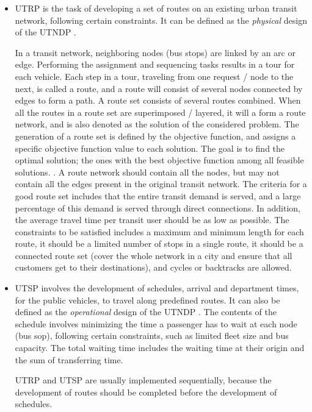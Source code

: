 \begin{itemize}
\item UTRP is the task of developing a set of routes on an existing urban transit network, following certain constraints. It can be defined as the \textit{physical} design of the UTNDP \citep{fan09}. 

In a transit network, neighboring nodes (bus stops) are linked by an arc or edge. Performing the assignment and sequencing tasks results in a tour for each vehicle. Each step in a tour, traveling from one request / node to the next, is called a route, and a route will consist of several nodes connected by edges to form a path. A route set consists of several routes combined. When all the routes in a route set are superimposed / layered, it will a form a route network, and is also denoted as the solution of the considered problem. The generation of a route set is defined by the objective function, and assigns a specific objective function value to each solution. The goal is to find the optimal solution; the ones with the best objective function among all feasible solutions. \citep{vehiclerouting}. A route network should contain all the nodes, but may not contain all the edges present in the original transit network. The criteria for a good route set includes that the entire transit demand is served, and a large percentage of this demand is served through direct connections. In addition, the average travel time per transit user should be as low as possible. The constraints to be satisfied includes a maximum and minimum length for each route, it should be a limited number of stops in a single route, it should be a connected route set  (cover the whole network in a city and ensure that all customers get to their destinations), and cycles or backtracks are allowed\citep{fan09}.

\item UTSP involves the development of schedules, arrival and department times, for the public vehicles, to travel along predefined routes. It can also be defined as the \textit{operational} design of the UTNDP \citep{fan09}. 
The contents of the schedule involves minimizing the time a passenger has to wait at each node (bus sop), following certain constraints, such as limited fleet size and bus capacity.  The total waiting time includes the waiting time at their origin and the sum of transferring time. 

UTRP and UTSP are usually implemented sequentially, because the development of routes should be completed before the development of schedules. 
\end{itemize}

